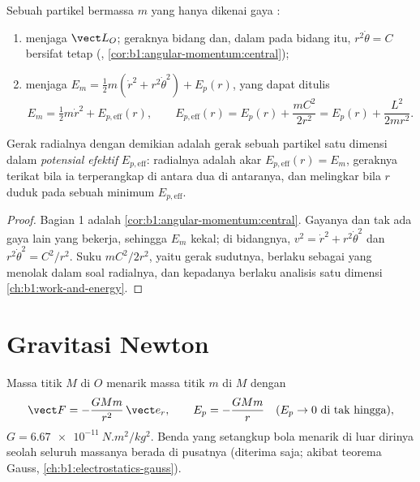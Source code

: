 \begin{theorem}\label{thm:b1:central-forces:reduction}
Sebuah partikel bermassa $m$ yang hanya dikenai gaya :
\begin{enumerate}
  \item menjaga  $\vect L_O$; geraknya bidang dan, dalam
         pada bidang itu, $r^2\dot\theta = C$ bersifat
        tetap (,
        \cref{cor:b1:angular-momentum:central});
  \item menjaga  $E_m = \tfrac12 m(\dot r^2 + r^2\dot\theta^2)
        + E_p(r)$, yang dapat ditulis
        \[
        E_m = \tfrac12 m\dot r^2 + E_{p,\mathrm{eff}}(r), \qquad
        E_{p,\mathrm{eff}}(r) = E_p(r) + \frac{mC^2}{2r^2} = E_p(r) + \frac{L^2}{2mr^2} .
        \]
\end{enumerate}
Gerak radialnya dengan demikian adalah gerak sebuah partikel satu
dimensi dalam \emph{potensial efektif} $E_{p,\mathrm{eff}}$: 
radialnya adalah akar $E_{p,\mathrm{eff}}(r) = E_m$, geraknya terikat
bila ia terperangkap di antara dua di antaranya, dan melingkar bila $r$
duduk pada sebuah minimum $E_{p,\mathrm{eff}}$.
\end{theorem}

\begin{proof}
Bagian 1 adalah \cref{cor:b1:angular-momentum:central}. Gayanya
 dan tak ada gaya lain yang bekerja, sehingga $E_m$ kekal; di
bidangnya, $v^2 = \dot r^2 + r^2\dot\theta^2$ dan $r^2\dot\theta^2 = C^2/r^2$.
Suku $mC^2/2r^2$, yaitu  gerak sudutnya, berlaku sebagai
\emph{} yang menolak dalam soal radialnya, dan
kepadanya berlaku analisis satu dimensi \cref{ch:b1:work-and-energy}.
\end{proof}

\section{Gravitasi Newton}

\begin{definition}\label{def:b1:central-forces:gravitation}
Massa titik $M$ di $O$ menarik massa titik $m$ di $M$ dengan
\[
\vect F = -\frac{GMm}{r^2}\,\vect e_r, \qquad E_p = -\frac{GMm}{r} \quad (E_p \to 0 \text{ di tak hingga}),
\]
$G = \qty{6.67e-11}{N.m^2/kg^2}$. Benda yang setangkup bola menarik di
luar dirinya seolah seluruh massanya berada di pusatnya (diterima saja;
akibat teorema Gauss, \cref{ch:b1:electrostatics-gauss}).
\end{definition}

